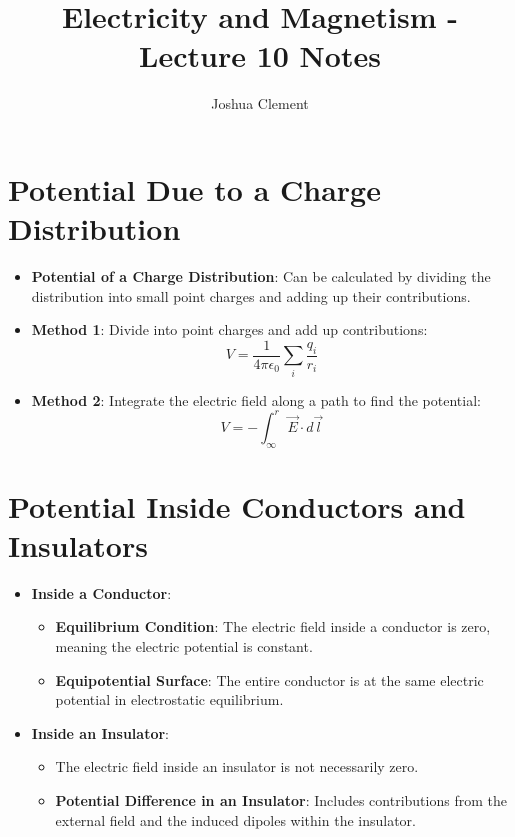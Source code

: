 \documentclass{article}
\begin{document}
\title{Electricity and Magnetism - Lecture 10 Notes}
\author{Joshua Clement}
\maketitle

\section*{Potential Due to a Charge Distribution}
\begin{itemize}
    \item \textbf{Potential of a Charge Distribution}: Can be calculated by dividing the distribution into small point charges and adding up their contributions.
    \item \textbf{Method 1}: Divide into point charges and add up contributions:
    \[
    V = \frac{1}{4\pi\epsilon_0} \sum_i \frac{q_i}{r_i}
    \]
    \item \textbf{Method 2}: Integrate the electric field along a path to find the potential:
    \[
    V = -\int_{\infty}^{r} \vec{E} \cdot d\vec{l}
    \]
\end{itemize}

\section*{Potential Inside Conductors and Insulators}
\begin{itemize}
    \item \textbf{Inside a Conductor}:
    \begin{itemize}
        \item \textbf{Equilibrium Condition}: The electric field inside a conductor is zero, meaning the electric potential is constant.
        \item \textbf{Equipotential Surface}: The entire conductor is at the same electric potential in electrostatic equilibrium.
    \end{itemize}
    \item \textbf{Inside an Insulator}:
    \begin{itemize}
        \item The electric field inside an insulator is not necessarily zero.
        \item \textbf{Potential Difference in an Insulator}: Includes contributions from the external field and the induced dipoles within the insulator.
    \end{itemize}
\end{itemize}
\end{document}

